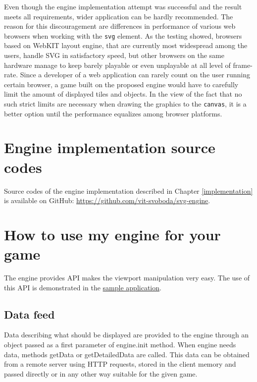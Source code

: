 \documentclass[11pt,oneside, final]{fithesis2}
\begin{document}
Even though the engine implementation attempt was successful and the result meets all requirements, wider application can be hardly recommended. The reason for this discouragement are differences in performance of various web browsers when working with the \texttt{svg} element. As the testing showed, browsers based on WebKIT layout engine, that are currently most widespread among the users, handle SVG in satisfactory speed, but other browsers on the same hardware manage to keep barely playable or even unplayable at all level of frame-rate. Since a developer of a web application can rarely count on the user running certain browser, a game built on the proposed engine would have to carefully limit the amount of displayed tiles and objects. In the view of the fact that no such strict limits are necessary when drawing the graphics to the \texttt{canvas}, it is a better option until the performance equalizes among browser platforms.


\appendix
\chapter{Engine implementation source codes}
Source codes of the engine implementation described in Chapter \ref{implementation} is available on GitHub: \href{https://github.com/vit-svoboda/svg-engine}{https://github.com/vit-svoboda/svg-engine}.

\chapter{How to use my engine for your game}
The engine provides API makes the viewport manipulation very easy. The use of this API is demonstrated in the \href{https://github.com/vit-svoboda/svg-engine/tree/master/src/main/webapp/Scripts/game}{sample application}.

\section{Data feed}
Data describing what should be displayed are provided to the engine through an object passed as a first parameter of engine.init method. When engine needs data, methods getData or getDetailedData are called. This data can be obtained from a remote server using HTTP requests, stored in the client memory and passed directly or in any other way suitable for the given game.
\end{document}
